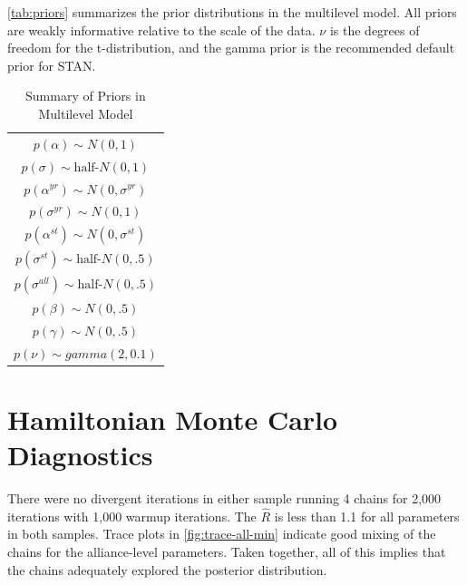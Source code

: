 \documentclass[12pt]{article}
\begin{document}
\autoref{tab:priors} summarizes the prior distributions in the multilevel model. 
All priors are weakly informative relative to the scale of the data. 
$\nu$ is the degrees of freedom for the t-distribution, and the gamma prior is the recommended default prior for STAN. 

\begin{table} %
\begin{center}
\begin{tabular}{c} 
$ p(\alpha) \sim N(0, 1)$  \\
$ p(\sigma) \sim \mbox{half-}N(0, 1) $ \\
$ p(\alpha^{yr}) \sim N(0, \sigma^{yr}) $ \\ 
$ p(\sigma^{yr}) \sim N(0, 1) $ \\
$ p(\alpha^{st}) \sim N(0, \sigma^{st}) $ \\ 
$ p(\sigma^{st}) \sim \mbox{half-}N(0, .5) $ \\ 
$ p(\sigma^{all}) \sim \mbox{half-}N(0, .5) $ \\
$ p(\beta) \sim N(0, .5) $ \\
$ p(\gamma) \sim N(0, .5) $ \\ 
$ p(\nu) \sim gamma(2, 0.1)$ 
\end{tabular} 
\caption{Summary of Priors in Multilevel Model} 
\label{tab:priors}
\end{center} 
\end{table} 


\section*{Hamiltonian Monte Carlo Diagnostics}

There were no divergent iterations in either sample running 4 chains for 2,000 iterations with 1,000 warmup iterations. 
The $\hat{R}$ is less than 1.1 for all parameters in both samples. 
Trace plots in \autoref{fig:trace-all-min} indicate good mixing of the chains for the alliance-level parameters. 
Taken together, all of this implies that the chains adequately explored the posterior distribution. 
\end{document}
